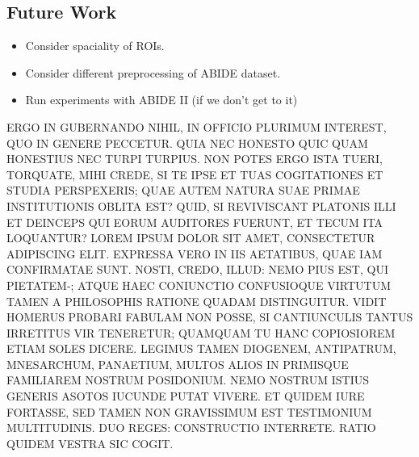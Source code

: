\documentclass[letterpaper]{article}
\begin{document}
\subsection{Future Work}
\begin{itemize}
    \item Consider spaciality of ROIs.
    \item Consider different preprocessing of ABIDE dataset.
    \item Run experiments with ABIDE II (if we don't get to it)
\end{itemize}


ERGO IN GUBERNANDO NIHIL, IN OFFICIO PLURIMUM INTEREST, QUO IN GENERE PECCETUR. QUIA NEC HONESTO QUIC QUAM HONESTIUS NEC TURPI TURPIUS. NON POTES ERGO ISTA TUERI, TORQUATE, MIHI CREDE, SI TE IPSE ET TUAS COGITATIONES ET STUDIA PERSPEXERIS; QUAE AUTEM NATURA SUAE PRIMAE INSTITUTIONIS OBLITA EST? QUID, SI REVIVISCANT PLATONIS ILLI ET DEINCEPS QUI EORUM AUDITORES FUERUNT, ET TECUM ITA LOQUANTUR?
LOREM IPSUM DOLOR SIT AMET, CONSECTETUR ADIPISCING ELIT. EXPRESSA VERO IN IIS AETATIBUS, QUAE IAM CONFIRMATAE SUNT. NOSTI, CREDO, ILLUD: NEMO PIUS EST, QUI PIETATEM-; ATQUE HAEC CONIUNCTIO CONFUSIOQUE VIRTUTUM TAMEN A PHILOSOPHIS RATIONE QUADAM DISTINGUITUR. VIDIT HOMERUS PROBARI FABULAM NON POSSE, SI CANTIUNCULIS TANTUS IRRETITUS VIR TENERETUR; QUAMQUAM TU HANC COPIOSIOREM ETIAM SOLES DICERE. LEGIMUS TAMEN DIOGENEM, ANTIPATRUM, MNESARCHUM, PANAETIUM, MULTOS ALIOS IN PRIMISQUE FAMILIAREM NOSTRUM POSIDONIUM. NEMO NOSTRUM ISTIUS GENERIS ASOTOS IUCUNDE PUTAT VIVERE. ET QUIDEM IURE FORTASSE, SED TAMEN NON GRAVISSIMUM EST TESTIMONIUM MULTITUDINIS. DUO REGES: CONSTRUCTIO INTERRETE. RATIO QUIDEM VESTRA SIC COGIT.

\appendix


\end{document}
